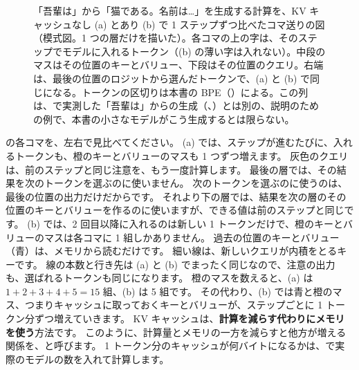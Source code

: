 \begin{figure}[tbp]
\caption{「吾輩は」から「猫である。名前は…」を生成する計算を、KV キャッシュなし (a) とあり (b) で 1 ステップずつ比べたコマ送りの図（模式図。1 つの層だけを描いた）。各コマの上の字は、そのステップでモデルに入れるトークン（(b) の薄い字は入れない）。中段のマスはその位置のキーとバリュー、下段はその位置のクエリ。右端は、最後の位置のロジットから選んだトークンで、(a) と (b) で同じになる。トークンの区切りは本書の BPE（）による。この列は、で実測した「吾輩は」からの生成（、）とは別の、説明のための例で、本書の小さなモデルがこう生成するとは限らない。}
\label{fig:ma-kvcache}
\end{figure}

の各コマを、左右で見比べてください。
(a) では、ステップが進むたびに、入れるトークンも、橙のキーとバリューのマスも 1 つずつ増えます。
灰色のクエリは、前のステップと同じ注意を、もう一度計算します。
最後の層では、その結果を次のトークンを選ぶのに使いません。
次のトークンを選ぶのに使うのは、最後の位置の出力だけだからです。
それより下の層では、結果を次の層のその位置のキーとバリューを作るのに使いますが、できる値は前のステップと同じです。
(b) では、2 回目以降に入れるのは新しい 1 トークンだけで、橙のキーとバリューのマスは各コマに 1 組しかありません。
過去の位置のキーとバリュー（青）は、メモリから読むだけです。
細い線は、新しいクエリが内積をとるキーです。
線の本数と行き先は (a) と (b) でまったく同じなので、注意の出力も、選ばれるトークンも同じになります。
橙のマスを数えると、(a) は $1+2+3+4+5=15$ 組、(b) は 5 組です。
その代わり、(b) では青と橙のマス、つまりキャッシュに取っておくキーとバリューが、ステップごとに 1 トークン分ずつ増えていきます。
KV キャッシュは、\textbf{計算を減らす代わりにメモリを使う}方法です。
このように、計算量とメモリの一方を減らすと他方が増える関係を、と呼びます。
1 トークン分のキャッシュが何バイトになるかは、で実際のモデルの数を入れて計算します。

